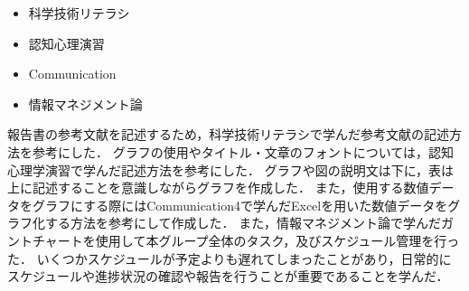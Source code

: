 \documentclass[../report]{subfiles}
\begin{document}
\begin{itemize}
    \item 科学技術リテラシ
    \item 認知心理演習
    \item Communication
    \item 情報マネジメント論
\end{itemize}

報告書の参考文献を記述するため，科学技術リテラシで学んだ参考文献の記述方法を参考にした．
グラフの使用やタイトル・文章のフォントについては，認知心理学演習で学んだ記述方法を参考にした．
グラフや図の説明文は下に，表は上に記述することを意識しながらグラフを作成した．
また，使用する数値データをグラフにする際にはCommunication4で学んだExcelを用いた数値データをグラフ化する方法を参考にして作成した．
また，情報マネジメント論で学んだガントチャートを使用して本グループ全体のタスク，及びスケジュール管理を行った．
いくつかスケジュールが予定よりも遅れてしまったことがあり，日常的にスケジュールや進捗状況の確認や報告を行うことが重要であることを学んだ．
\end{document}
